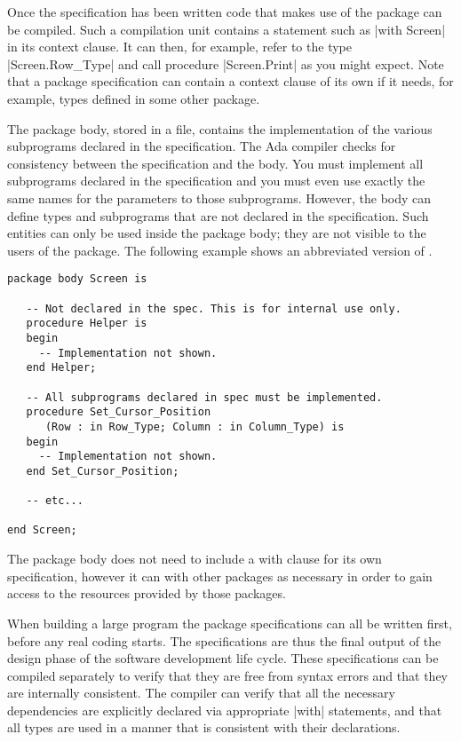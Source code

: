 Once the specification has been written code that makes use of the package can be compiled. Such
a compilation unit contains a statement such as |with Screen| in its context clause. It can
then, for example, refer to the type |Screen.Row_Type| and call procedure |Screen.Print| as you
might expect. Note that a package specification can contain a context clause of its own if it
needs, for example, types defined in some other package.

The package body, stored in a  file, contains the implementation of the various
subprograms declared in the specification. The Ada compiler checks for consistency between the
specification and the body. You must implement all subprograms declared in the specification and
you must even use exactly the same names for the parameters to those subprograms. However,
the body can define types and subprograms that are not declared in the specification. Such
entities can only be used inside the package body; they are not visible to the users of the
package. The following example shows an abbreviated version of .

\begin{lstlisting}
package body Screen is

   -- Not declared in the spec. This is for internal use only.
   procedure Helper is
   begin
     -- Implementation not shown.
   end Helper;

   -- All subprograms declared in spec must be implemented.
   procedure Set_Cursor_Position
      (Row : in Row_Type; Column : in Column_Type) is
   begin
     -- Implementation not shown.
   end Set_Cursor_Position;

   -- etc...

end Screen;
\end{lstlisting}

The package body does not need to include a with clause for its own specification, however it
can with other packages as necessary in order to gain access to the resources provided by those
packages.

When building a large program the package specifications can all be written first, before any
real coding starts. The specifications are thus the final output of the design phase of the
software development life cycle. These specifications can be compiled separately to verify that
they are free from syntax errors and that they are internally consistent. The compiler can
verify that all the necessary dependencies are explicitly declared via appropriate |with|
statements, and that all types are used in a manner that is consistent with their declarations.

